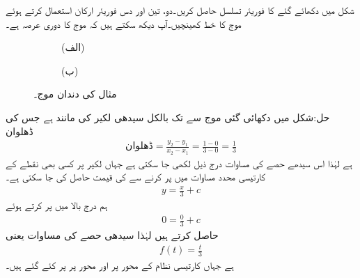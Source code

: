 شکل  میں دکھائے گئے  کا فوریئر تسلسل حاصل کریں۔دو، تین اور دس فوریئر ارکان استعمال کرتے ہوئے  موج کا خط کھینچیں۔آپ دیکھ سکتے ہیں کہ موج کا دوری عرصہ  ہے۔
\begin{figure}
\centering
\begin{subfigure}{0.5\textwidth}
\centering
{}
\caption*{(الف)}
\end{subfigure}%
\begin{subfigure}{0.5\textwidth}
\centering
{}
\caption*{(ب)}
\end{subfigure}%
\caption{مثال  کی دندان موج۔}
\label{شکل_فوریئر_دندان_موج_الف}
\end{figure}

حل:شکل میں دکھائی گئی موج  سے  تک بالکل سیدھی لکیر کی مانند ہے جس کی ڈھلوان 
\begin{align*}
\text{ڈھلوان}=\frac{y_2-y_1}{x_2-x_1}=\frac{1-0}{3-0}=\frac{1}{3}
\end{align*}
ہے لہٰذا اس سیدھے حصے کی مساوات درج ذیل لکھی جا سکتی ہے جہاں لکیر پر کسی بھی نقطے کے کارتیسی محدد مساوات میں پر کرنے سے  کی قیمت حاصل کی جا سکتی ہے۔
\begin{align*}
y=\frac{x}{3}+c
\end{align*}
ہم درج بالا میں  پر کرتے ہوئے
\begin{align*}
0=\frac{0}{3}+c
\end{align*}
  حاصل کرتے ہیں لہٰذا سیدھی حصے کی مساوات  یعنی
\begin{align}
f(t)=\frac{t}{3}
\end{align}
ہے جہاں کارتیسی نظام کے  محور پر  اور  محور پر  پر کئے گئے ہیں۔

